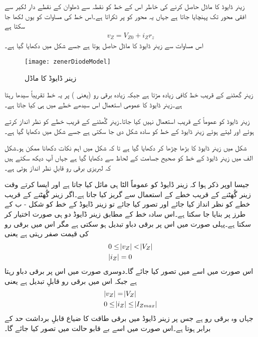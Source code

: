 زینر ڈایوڈ کا ماڈل حاصل کرنے کی خاطر اس کے خط کو نقطہ   سے ڈھلوان   کے نقطے دار لکیر سے افقی محور تک پہنچایا جاتا ہے جہاں یہ محور کو   پر ٹکراتا ہے۔اس خط کی مساوات کو یوں لکھا جا سکتا ہے
\begin{align}
v_Z=V_{Z0}+i_Z r_z
\end{align}
اس مساوات سے زینر ڈایوڈ کا ماڈل حاصل ہوتا ہے جسے شکل  میں دکھایا گیا ہے۔
\begin{figure}
\centering
\texttt{[image: zenerDiodeModel]}
\caption{زینر ڈایوڈ کا ماڈل}
\label{شکل_زینر_ڈایوڈ_کا_ماڈل}
\end{figure}
زینر گھٹنے کے قریب خط کافی زیادہ مڑتا ہے جبکہ زیادہ برقی رو (یعنی   ) پر یہ خط تقریباً سیدھا رہتا ہے۔زینر ڈایوڈ کا عمومی استعمال اس سیدھے خطے میں ہی کیا جاتا ہے۔


زینر ڈایوڈ کو عموماً  کے قریب استعمال نہیں کیا جاتا۔زینر گُھٹنے کے قریب خطے کو نظر انداز کرتے ہوئے اور   لیتے ہوئے زینر ڈایوڈ کے خط کو سادہ شکل دی جا سکتی ہے جسے شکل میں دکھایا گیا ہے۔

شکل   میں زینر ڈایوڈ کا  بڑھا چڑھا کر دکھایا گیا ہے تا کہ شکل میں اہم نکات دکھانا ممکن ہو۔شکل  الف میں زینر ڈایوڈ کے خط کو صحیح جسامت کے لحاظ سے دکھایا گیا ہے جہاں آپ دیکھ سکتے ہیں کہ لبریزی برقی رو قابلِ نظر انداز ہوتی ہے۔

جیسا اوپر ذکر ہوا کہ زینر ڈایوڈ کو عموماً الٹا ہی مائل کیا جاتا ہے اور ایسا کرتے وقت زینر گُھٹنے کے قریب خطے کے استعمال سے گریز کیا جاتا ہے۔اگر زینر گُھٹنے کے قریب خطے کو نظر انداز کیا جائے اور    تصور کیا جائے تو زینر ڈایوڈ کے خط کو  شکل  - ب کے طرز پر بنایا جا سکتا ہے۔اس سادہ خط کے مطابق زینر ڈایوڈ دو ہی صورت اختیار کر سکتا ہے۔پہلی صورت میں اس پر برقی دباو تبدیل ہو سکتی ہے مگر اس میں برقی رو کی قیمت صفر رہتی ہے یعنی
\begin{gather} \label{مساوات_زینر_سادہ_مساوات_الف}
\begin{aligned}
& 0  \leq \abs{v_Z} < \abs{V_Z}\\
& \abs{i_Z}=0
\end{aligned}
\end{gather}
اس صورت میں اسے  میں تصور کیا جائے گا۔دوسری صورت میں اس پر برقی دباو   رہتا ہے جبکہ اس میں برقی رو قابلِ تبدیل ہے یعنی
\begin{gather} \label{مساوات_زینر_سادہ_مساوات_ب}
\begin{aligned}
& \abs{v_Z}= \abs{V_Z}\\
& 0 \leq  \abs{i_Z} \leq \abs{I_{Zmax}}
\end{aligned}
\end{gather}
جہاں   وہ برقی رو ہے جس پر زینر ڈایوڈ میں برقی طاقت کا ضیاع قابلِ برداشت حد کے برابر ہوتا ہے۔اس صورت میں اسے بے قابو حالت میں تصور کیا جائے گا۔

